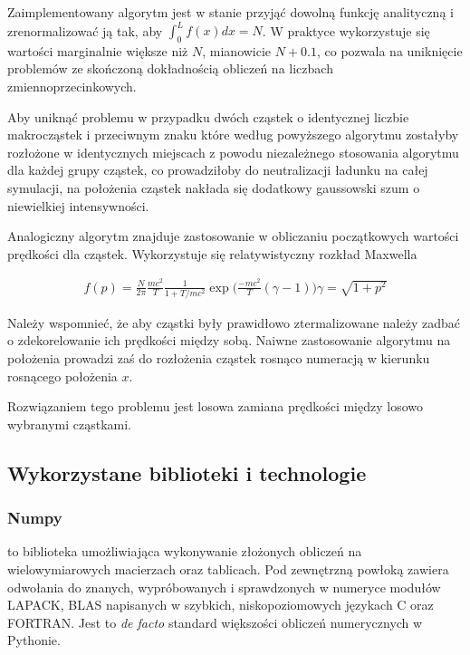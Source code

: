 
    Zaimplementowany algorytm jest w stanie przyjąć dowolną funkcję analityczną %
    i zrenormalizować ją tak, aby $\int_0^L f(x) dx = N$. W praktyce wykorzystuje się wartości marginalnie większe
    niż $N$, mianowicie $N+0.1$, co pozwala na uniknięcie problemów ze skończoną dokładnością obliczeń
    na liczbach zmiennoprzecinkowych.

    Aby uniknąć problemu w przypadku dwóch  cząstek o identycznej liczbie makrocząstek i przeciwnym znaku
    które według powyższego algorytmu zostałyby rozłożone w identycznych miejscach z powodu niezależnego
    stosowania algorytmu dla każdej grupy cząstek, co prowadziłoby do neutralizacji ładunku na całej symulacji,
    na położenia cząstek nakłada się dodatkowy gaussowski szum o niewielkiej intensywności.

    Analogiczny algorytm znajduje zastosowanie w obliczaniu początkowych wartości prędkości dla cząstek.
    Wykorzystuje się relatywistyczny rozkład Maxwella

    \begin{align}
        f(p) = \frac{N}{2 \pi} \frac{mc^2}{T} \frac{1}{1+T/mc^2} \exp \Big (\frac{-mc^2}{T}(\gamma -1) \Big)
        \gamma = \sqrt{1+p^2}
        \label{relativistic-maxwell-distribution}
    \end{align}

    Należy wspomnieć, że aby cząstki były prawidłowo ztermalizowane %
    należy zadbać o zdekorelowanie ich prędkości między sobą. Naiwne zastosowanie algorytmu na położenia
    prowadzi zaś do rozłożenia cząstek rosnąco numeracją w kierunku rosnącego położenia $x$.

    Rozwiązaniem tego problemu jest losowa zamiana prędkości między losowo wybranymi cząstkami.

    \subsection{Wykorzystane biblioteki i technologie}

    \subsubsection{Numpy}
     to biblioteka umożliwiająca wykonywanie złożonych obliczeń na wielowymiarowych macierzach
    oraz tablicach.
    Pod zewnętrzną powłoką zawiera odwołania do
    znanych, wypróbowanych i sprawdzonych w numeryce modułów LAPACK, BLAS
    napisanych w szybkich, niskopoziomowych językach C oraz FORTRAN. Jest to \emph{de facto}
    standard większości obliczeń numerycznych w Pythonie.

